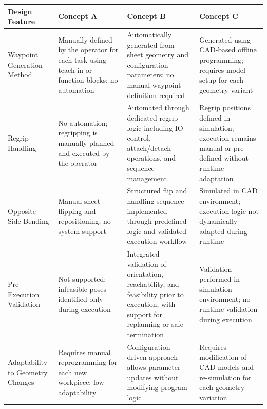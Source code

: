 \begin{landscape}
\begin{table}[htbp]
\centering
\scriptsize
\setlength{\tabcolsep}{3pt}
\renewcommand{\arraystretch}{0.92}
\begin{tabularx}{\linewidth}{L{3.6cm} L{5.1cm} L{6.8cm} L{5.8cm}}
\toprule
\textbf{Design Feature} &
\textbf{Concept A} &
\textbf{Concept B} &
\textbf{Concept C} \\
\midrule
 
Waypoint Generation Method &
Manually defined by the operator for each task using teach-in or function blocks; no automation \cite{Siciliano2016Robotics} &
Automatically generated from sheet geometry and configuration parameters; no manual waypoint definition required \cite{dragandbot_anyrobot_2025} &
Generated using CAD-based offline programming; requires model setup for each geometry variant \cite{Pan2012Survey} \\
 
Regrip Handling &
No automation; regripping is manually planned and executed by the operator \cite{Aomura2002RoboticBending} &
Automated through dedicated regrip logic including IO control, attach/detach operations, and sequence management \cite{Aomura2002RoboticBending,Gupta1998SheetMetalBending} &
Regrip positions defined in simulation; execution remains manual or pre-defined without runtime adaptation \cite{Bar2018VirtualCommissioning} \\
 
Opposite-Side Bending &
Manual sheet flipping and repositioning; no system support &
Structured flip and handling sequence implemented through predefined logic and validated execution workflow \cite{Gupta1998SheetMetalBending} &
Simulated in CAD environment; execution logic not dynamically adapted during runtime \cite{Bar2018VirtualCommissioning} \\
 
Pre-Execution Validation &
Not supported; infeasible poses identified only during execution \cite{Siciliano2016Robotics} &
Integrated validation of orientation, reachability, and feasibility prior to execution, with support for replanning or safe termination &
Validation performed in simulation environment; no runtime validation during execution \cite{Pan2012Survey} \\
 
Adaptability to Geometry Changes &
Requires manual reprogramming for each new workpiece; low adaptability \cite{Pan2012Survey} &
Configuration-driven approach allows parameter updates without modifying program logic &
Requires modification of CAD models and re-simulation for each geometry variation \cite{Bar2018VirtualCommissioning} \\
 

\end{tabularx}
\end{table}
\end{landscape}
